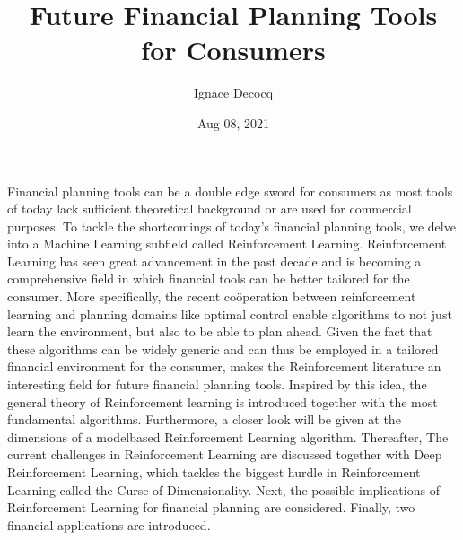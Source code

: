 \documentclass[letterpaper,10pt,english]{jupyterBook}
\title{Future Financial Planning Tools for Consumers}
\date{Aug 08, 2021}
\author{Ignace Decocq}
\begin{document}
\pagestyle{empty}
\sphinxmaketitle
\pagestyle{plain}
\sphinxtableofcontents
\pagestyle{normal}
\label{\detokenize{abstract::doc}}


\sphinxAtStartPar
Financial planning tools can be a double edge sword for consumers as most tools of today lack sufficient theoretical background or are used for commercial purposes. To tackle the shortcomings of today’s financial planning tools, we delve into a Machine Learning subfield called Reinforcement Learning. Reinforcement Learning has seen great advancement in the past decade and is becoming a comprehensive field in which financial tools can be better tailored for the consumer. More specifically, the recent coöperation between reinforcement learning and planning domains like optimal control enable algorithms to not just learn the environment, but also to be able to plan ahead. Given the fact that these algorithms can be widely generic and can thus be employed in a tailored financial environment for the consumer, makes the Reinforcement literature an interesting field for future financial planning tools. Inspired by this idea, the general theory of Reinforcement learning is introduced together with the most fundamental algorithms. Furthermore, a closer look will be given at the dimensions of a model\sphinxhyphen{}based Reinforcement Learning algorithm. Thereafter, The current challenges in Reinforcement Learning are discussed together with Deep Reinforcement Learning, which tackles the biggest hurdle in Reinforcement Learning called the Curse of Dimensionality. Next, the possible implications of Reinforcement Learning for financial planning are considered. Finally, two financial applications are introduced.
\end{document}

